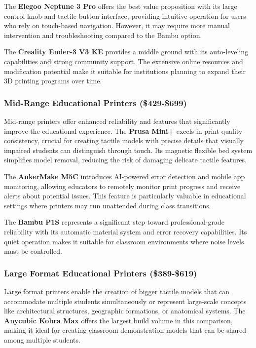 The \textbf{Elegoo Neptune 3 Pro} offers the best value proposition with its large control knob and tactile button interface, providing intuitive operation for users who rely on touch-based navigation. However, it may require more manual intervention and troubleshooting compared to the Bambu option.

The \textbf{Creality Ender-3 V3 KE} provides a middle ground with its auto-leveling capabilities and strong community support. The extensive online resources and modification potential make it suitable for institutions planning to expand their 3D printing programs over time.

\subsubsection{Mid-Range Educational Printers (\$429-\$699)}
Mid-range printers offer enhanced reliability and features that significantly improve the educational experience. The \textbf{Prusa Mini+} excels in print quality consistency, crucial for creating tactile models with precise details that visually impaired students can distinguish through touch. Its magnetic flexible bed system simplifies model removal, reducing the risk of damaging delicate tactile features.

The \textbf{AnkerMake M5C} introduces AI-powered error detection and mobile app monitoring, allowing educators to remotely monitor print progress and receive alerts about potential issues. This feature is particularly valuable in educational settings where printers may run unattended during class transitions.

The \textbf{Bambu P1S} represents a significant step toward professional-grade reliability with its automatic material system and error recovery capabilities. Its quiet operation makes it suitable for classroom environments where noise levels must be controlled.

\subsubsection{Large Format Educational Printers (\$389-\$619)}
Large format printers enable the creation of bigger tactile models that can accommodate multiple students simultaneously or represent large-scale concepts like architectural structures, geographic formations, or anatomical systems. The \textbf{Anycubic Kobra Max} offers the largest build volume in this comparison, making it ideal for creating classroom demonstration models that can be shared among multiple students.

